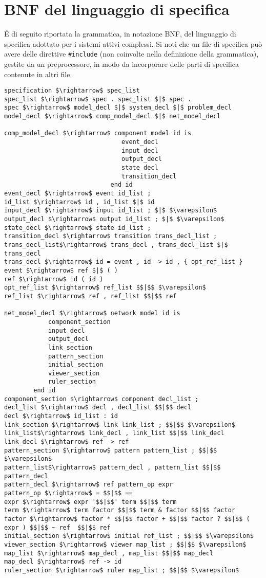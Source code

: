 \chapter{BNF del linguaggio di specifica} \label{bnf}
\'E di seguito riportata la grammatica, in notazione BNF, del linguaggio di specifica adottato per i sistemi attivi complessi. 
Si noti che un file di specifica può avere delle direttive \verb|#include| (non coinvolte nella definizione della grammatica), gestite da un preprocessore, in modo da incorporare delle parti di specifica contenute in altri file.

\begin{lstlisting}
specification $\rightarrow$ spec_list
spec_list $\rightarrow$ spec . spec_list $|$ spec .
spec $\rightarrow$ model_decl $|$ system_decl $|$ problem_decl
model_decl $\rightarrow$ comp_model_decl $|$ net_model_decl

comp_model_decl $\rightarrow$ component model id is
                              	event_decl
                              	input_decl
                              	output_decl
                              	state_decl
                              	transition_decl
                             end id
event_decl $\rightarrow$ event id_list ;
id_list $\rightarrow$ id , id_list $|$ id
input_decl $\rightarrow$ input id_list ; $|$ $\varepsilon$
output_decl $\rightarrow$ output id_list ; $|$ $\varepsilon$
state_decl $\rightarrow$ state id_list ; 
transition_decl $\rightarrow$ transition trans_decl_list ;
trans_decl_list$\rightarrow$ trans_decl , trans_decl_list $|$ trans_decl
trans_decl $\rightarrow$ id = event , id -> id , { opt_ref_list }
event $\rightarrow$ ref $|$ ( )
ref $\rightarrow$ id ( id )
opt_ref_list $\rightarrow$ ref_list $$|$$ $\varepsilon$
ref_list $\rightarrow$ ref , ref_list $$|$$ ref

net_model_decl $\rightarrow$ network model id is
			component_section
			input_decl
			output_decl
			link_section
			pattern_section
			initial_section
			viewer_section
			ruler_section
		end id
component_section $\rightarrow$ component decl_list ;
decl_list $\rightarrow$ decl , decl_list $$|$$ decl
decl $\rightarrow$ id_list : id
link_section $\rightarrow$ link link_list ; $$|$$ $\varepsilon$
link_list$\rightarrow$ link_decl , link_list $$|$$ link_decl
link_decl $\rightarrow$ ref -> ref
pattern_section $\rightarrow$ pattern pattern_list ; $$|$$ $\varepsilon$
pattern_list$\rightarrow$ pattern_decl , pattern_list $$|$$ pattern_decl
pattern_decl $\rightarrow$ ref pattern_op expr
pattern_op $\rightarrow$ = $$|$$ ==
expr $\rightarrow$ expr '$$|$$' term $$|$$ term
term $\rightarrow$ term factor $$|$$ term & factor $$|$$ factor
factor $\rightarrow$ factor * $$|$$ factor + $$|$$ factor ? $$|$$ ( expr ) $$|$$ ~ ref  $$|$$ ref 
initial_section $\rightarrow$ initial ref_list ; $$|$$ $\varepsilon$
viewer_section $\rightarrow$ viewer map_list ; $$|$$ $\varepsilon$
map_list $\rightarrow$ map_decl , map_list $$|$$ map_decl
map_decl $\rightarrow$ ref -> id
ruler_section $\rightarrow$ ruler map_list ; $$|$$ $\varepsilon$


\end{lstlisting}

